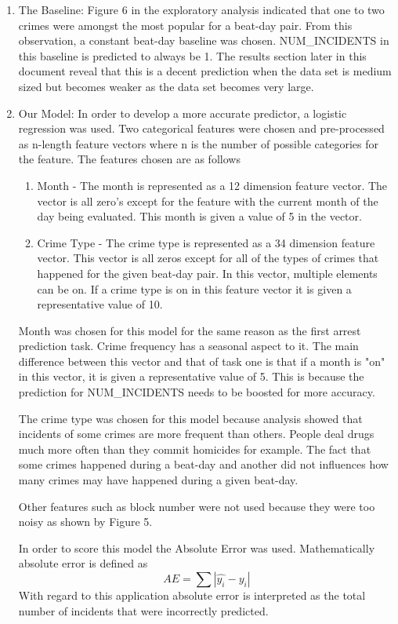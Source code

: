 \documentclass[journal]{IEEEtran}
\begin{document}
\begin{enumerate}
\item 
The Baseline: Figure 6 in the exploratory analysis indicated that one to two crimes were amongst the most popular for a beat-day pair. From this observation, a constant beat-day baseline was chosen. NUM\_INCIDENTS in this baseline is predicted to always be 1. The results section later in this document reveal that this is a decent prediction when the data set is medium sized but becomes weaker as the data set becomes very large. 

\item Our Model: In order to develop a more accurate predictor, a logistic regression was used. Two categorical features were chosen and pre-processed as n-length feature vectors where n is the number of possible categories for the feature. The features chosen are as follows
\begin{enumerate}
\item Month - The month is represented as a 12 dimension feature vector. The vector is all zero's except for the feature with the current month of the day being evaluated. This month is given a value of 5 in the vector. 
\item Crime Type - The crime type is represented as a 34 dimension feature vector. This vector is all zeros except for all of the types of crimes that happened for the given beat-day pair. In this vector, multiple elements can be on. If a crime type is on in this feature vector it is given a representative value of 10. 
\end{enumerate}

Month was chosen for this model for the same reason as the first arrest prediction task. Crime frequency has a seasonal aspect to it. The main difference between this vector and that of task one is that if a month is "on" in this vector, it is given a representative value of 5. This is because the prediction for NUM\_INCIDENTS needs to be boosted for more accuracy. 

The crime type was chosen for this model because analysis showed that incidents of some crimes are more frequent than others. People deal drugs much more often than they commit homicides for example. The fact that some crimes happened during a beat-day and another did not influences how many crimes may have happened during a given beat-day. 

Other features such as block number were not used because they were too noisy as shown by Figure 5. 

In order to score this model the Absolute Error was used. Mathematically absolute error is defined as 
    $$ AE = \sum |\hat{y_i} - y_i| $$
With regard to this application absolute error is interpreted as the total number of incidents that were incorrectly predicted.
\end{enumerate}
\end{document}
